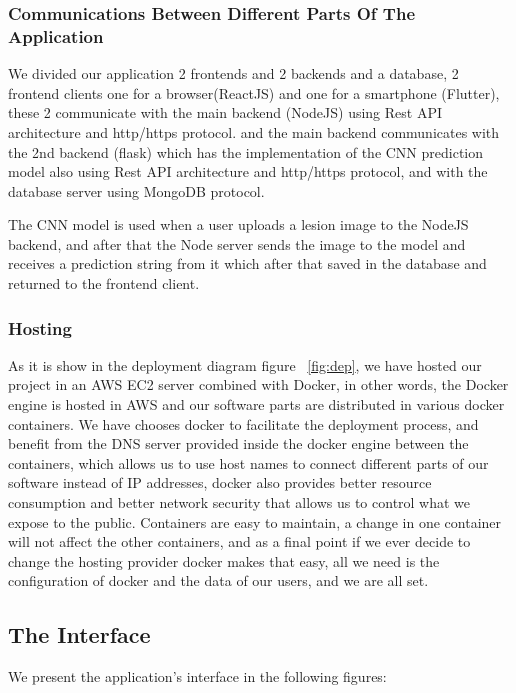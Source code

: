     \subsubsection{Communications Between Different Parts Of The Application}
        We divided our application 2 frontends and 2 backends and a database, 2 frontend clients one for a browser(ReactJS) and one for a smartphone (Flutter), these 2 communicate with the main backend (NodeJS) using Rest API architecture and http/https protocol. and the main backend communicates with the 2nd backend (flask) which has the implementation of the CNN prediction model also using Rest API architecture and http/https protocol, and with the database server using MongoDB protocol.

        The CNN model is used when a user uploads a lesion image to the NodeJS backend, and after that the Node server sends the image to the model and receives a prediction string from it which after that saved in the database and returned to the frontend client.

    \subsubsection{Hosting}
    As it is show in the deployment diagram figure ~\ref{fig:dep}, we have hosted our project in an AWS EC2 server combined with Docker, in other words, the Docker engine is hosted in AWS and our software parts are distributed  in various docker containers.
    We have chooses docker to facilitate the deployment process, and benefit from the DNS server provided inside the docker engine between the containers, which allows us to use host names to connect different parts of our software instead of IP addresses, docker also provides better resource consumption and better network security that allows us to control what we expose to the public. Containers are easy to maintain, a change in one container will not affect the other containers, and as a final point if we ever decide to change the hosting provider docker makes that easy, all we need is the configuration of docker and the data of our users, and we are all set.

    \subsection{The Interface}
        We present the application's interface in the following figures: 



